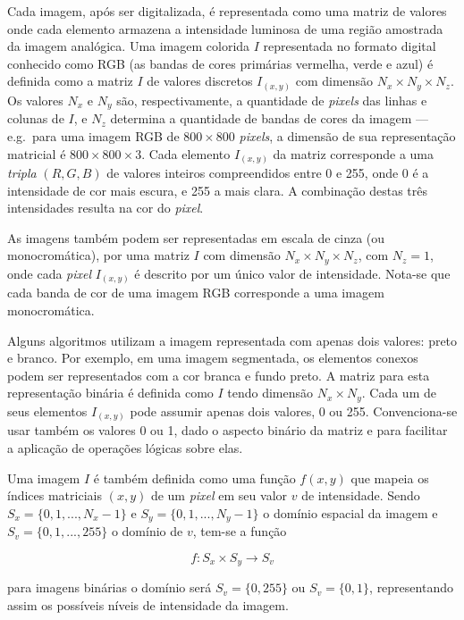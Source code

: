 Cada imagem, após ser digitalizada, é representada como uma matriz de
valores onde cada elemento armazena a intensidade luminosa de uma
região amostrada da imagem analógica. Uma imagem colorida $I$
representada no formato digital conhecido como RGB (as bandas de cores
primárias vermelha, verde e azul) é definida como a matriz $I$ de
valores discretos $I_{(x,y)}$ com dimensão $N_x \times N_y \times
N_z$. Os valores $N_x$ e $N_y$ são, respectivamente, a quantidade
de \textit{pixels} das linhas e colunas de $I$, e $N_z$ determina a
quantidade de bandas de cores da imagem --- e.g.\ para uma imagem RGB
de $800 \times 800$ \textit{pixels}, a dimensão de sua representação
matricial é $800 \times 800 \times 3$. Cada elemento $I_{(x,y)}$ da
matriz corresponde a uma \emph{tripla} $(R, G, B)$ de valores inteiros
compreendidos entre 0 e 255, onde 0 é a intensidade de cor mais
escura, e 255 a mais clara. A combinação destas três intensidades
resulta na cor do \textit{pixel}.

As imagens também podem ser representadas em escala de cinza (ou
monocromática), por uma matriz $I$ com dimensão $N_x \times N_y \times
N_z$, com $N_z = 1$, onde cada \textit{pixel} $I_{(x,y)}$ é descrito por um único valor de
intensidade. Nota-se que cada banda de cor de uma imagem RGB
corresponde a uma imagem monocromática.

Alguns algoritmos utilizam a imagem representada com apenas dois
valores: preto e branco. Por exemplo, em uma imagem segmentada, os
elementos conexos podem ser representados com a cor branca e fundo
preto. A matriz para esta representação binária é definida como $I$
tendo dimensão $N_x \times N_y$. Cada um de seus elementos $I_{(x,y)}$
pode assumir apenas dois valores, 0 ou 255. Convenciona-se usar também
os valores 0 ou 1, dado o aspecto binário da matriz e para facilitar a
aplicação de operações lógicas sobre elas.~\cite{gonzalez}

Uma imagem $I$ é também definida como uma função $f(x,y)$ que mapeia
os índices matriciais $(x,y)$ de um \textit{pixel} em seu valor $v$ de
intensidade. Sendo $S_x = \{0, 1, ..., N_x - 1\}$ e $S_y = \{0, 1,
..., N_y - 1\}$ o domínio espacial da imagem e $S_v = \{0, 1, ...,
255\}$ o domínio de $v$, tem-se a função

\begin{equation}
  f : S_x \times S_y \to S_v
\end{equation}

\noindent para imagens binárias o domínio será $S_v = \{0, 255\}$ ou $S_v = \{0,
1\}$, representando assim os possíveis níveis de intensidade da
imagem.~\cite{gonzalez}

